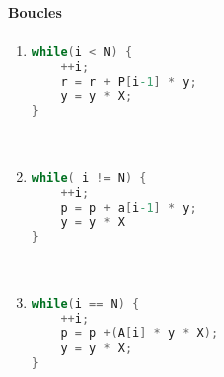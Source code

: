 \paragraph{Boucles} 
	\begin{enumerate} 
		\item \begin{lstlisting}[language=C,numbers=none]
while(i < N) { 
	++i; 
	r = r + P[i-1] * y; 
	y = y * X; 
}
		\end{lstlisting}~
		\item \begin{lstlisting}[language=C,numbers=none]
while( i != N) { 
	++i; 
	p = p + a[i-1] * y; 
	y = y * X 
} 
\end{lstlisting}~
\item \begin{lstlisting}[language=C,numbers=none]
while(i == N) { 
	++i;	
	p = p +(A[i] * y * X); 
	y = y * X; 
}
\end{lstlisting}
	\end{enumerate}

